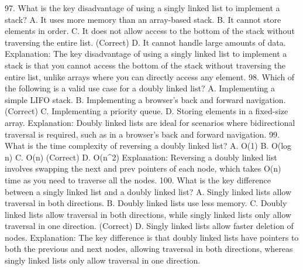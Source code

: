 97. What is the key disadvantage of using a singly linked list to implement a stack?
A. It uses more memory than an array-based stack.
B. It cannot store elements in order.
C. It does not allow access to the bottom of the stack without traversing the entire list. (Correct)
D. It cannot handle large amounts of data.
Explanation: The key disadvantage of using a singly linked list to implement a stack is that you cannot access the bottom of the stack without traversing the entire list, unlike arrays where you can directly access any element.
98. Which of the following is a valid use case for a doubly linked list?
A. Implementing a simple LIFO stack.
B. Implementing a browser’s back and forward navigation. (Correct)
C. Implementing a priority queue.
D. Storing elements in a fixed-size array.
Explanation: Doubly linked lists are ideal for scenarios where bidirectional traversal is required, such as in a browser’s back and forward navigation.
99. What is the time complexity of reversing a doubly linked list?
A. O(1)
B. O(log n)
C. O(n) (Correct)
D. O(n^2)
Explanation: Reversing a doubly linked list involves swapping the next and prev pointers of each node, which takes O(n) time as you need to traverse all the nodes.
100. What is the key difference between a singly linked list and a doubly linked list?
A. Singly linked lists allow traversal in both directions.
B. Doubly linked lists use less memory.
C. Doubly linked lists allow traversal in both directions, while singly linked lists only allow traversal in one direction. (Correct)
D. Singly linked lists allow faster deletion of nodes.
Explanation: The key difference is that doubly linked lists have pointers to both the previous and next nodes, allowing traversal in both directions, whereas singly linked lists only allow traversal in one direction.














